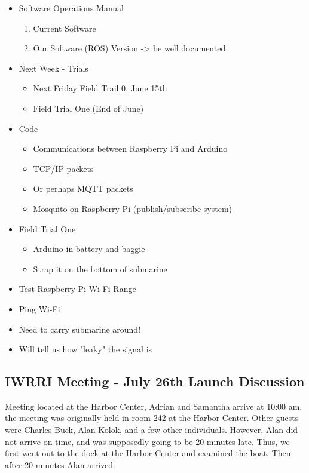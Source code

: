 \documentclass[12pt]{article}
\begin{document}
\begin{itemize}
			\item Software Operations Manual
			\begin{enumerate}
				\item Current Software
				\item Our Software (ROS) Version -> be well documented
			\end{enumerate}
			\item Next Week - Trials
			\begin{itemize}
				\item Next Friday Field Trail 0, June 15th
				\item Field Trial One (End of June)
			\end{itemize}
			\item Code
			\begin{itemize}
				\item Communications between Raspberry Pi and Arduino 
				\item TCP/IP packets
				\item Or perhaps MQTT packets
				\item Mosquito on Raspberry Pi (publish/subscribe system)
			\end{itemize}
			\item Field Trial One
			\begin{itemize}
				\item Arduino in battery and baggie
				\item Strap it on the bottom of submarine
			\end{itemize}
			\item Test Raspberry Pi Wi-Fi Range
			\item Ping Wi-Fi
			\item Need to carry submarine around!
			\item Will tell us how "leaky" the signal is
		\end{itemize}
	
		\subsection{IWRRI Meeting - July 26th Launch Discussion}
		
		\noindent
		Meeting located at the Harbor Center, Adrian and Samantha arrive at 10:00 am, the meeting was originally held in room 242 at the Harbor Center. Other guests were Charles Buck, Alan Kolok, and a few other individuals. However, Alan did not arrive on time, and was supposedly going to be 20 minutes late. Thus, we first went out to the dock at the Harbor Center and examined the boat. Then after 20 minutes Alan arrived.
		
\end{document}
